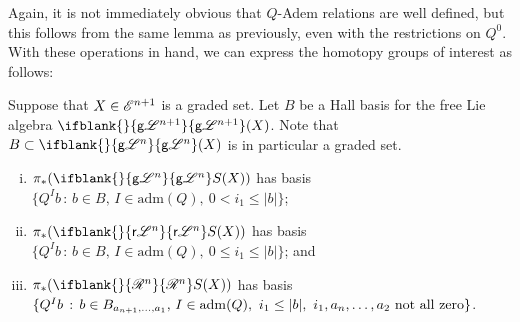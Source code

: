 \documentclass[11pt]{article}
\makeatletter
\newcommand{\GS}[1]{\scrE^{#1}}
\newcommand{\RestLie}[1]{\mathsf{r}{\scrL}^{#1}}%
\newcommand{\GoodLie}[1]{\mathsf{g}{\scrL}^{#1}}%
\newcommand{\PRLie}[1]{\scrR^{#1}}%
\newcommand{\produces}[3]{{#1}{#3}{#2}}
\newcommand{\admis}[1]{\mathrm{adm}(#1)}%
\newcommand{\Fr}[2][]{\ifblank{#1}{#2}{#2_{#1}}}
\newcommand{\restn}[2][]{\ifblank{#1}{\xi{#2}}{\xi_{#1}{#2}}}%
\renewcommand{\Q}{Q}
\newcommand{\minDim}{m}
\renewcommand{\produces}[3]{
{
\def\labelstyle{\scriptstyle}
\xymatrix@C=2em@1{
{#1}
\ar@{-}[r]|-{{\,#3\,}}
&%
{#2}%
}}}
\makeatother
\begin{document}
\begin{CategoriesOfInterest}
\begin{prop*}
%
%
%
%
\end{prop*}

\noindent Again, it is not immediately obvious that $\Q$-Adem relations are well defined, but this follows from the same lemma as previously, even with the restrictions on $\Q^0$. 
With these operations in hand, we can express the homotopy groups of interest as follows:
\begin{prop*}
Suppose that $X\in\GS{n+1}$ is a graded set. Let $B$ be a Hall basis for the free Lie algebra $\Fr{\GoodLie{n+1}}(X)$. Note that $B\subset \Fr{\GoodLie{n}}(X)$ is in particular a graded set.
\begin{enumerate}[i)]\squishlist
\setlength{\parindent}{.25in}
\item $\pi_*(\Fr{\GoodLie{n}}S(X))$ has basis $\{\Q^Ib\,:\,b\in B,\,I\in\admis{\Q},\ 0<i_1\leq|b|\}$;
\item $\pi_*(\Fr{\RestLie{n}}S(X))$ has basis $\{\Q^Ib\,:\,b\in B,\,I\in\admis{\Q},\ 0\leq i_1\leq|b|\}$; and
\item $\pi_*(\Fr{\PRLie{n}}S(X))$ has basis $\{\Q^Ib\,:\,b\in B_{a_{n+1},\ldots,a_1},\,I\in\admis{\Q},\ i_1\leq|b|,\ i_1,a_{n},\ldots,a_2\textup{ not all zero}\}$.

\end{enumerate}
\end{prop*}
\end{CategoriesOfInterest}
\end{document}
